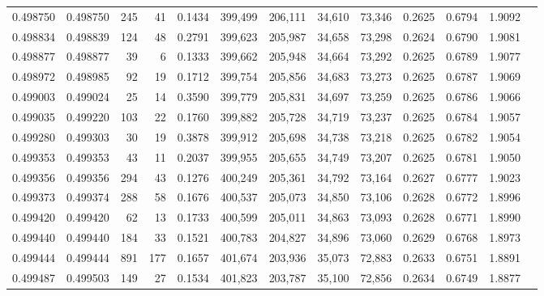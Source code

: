 \begin{tabular}{rrrrrrrrrrrrr}
0.498750 & 0.498750 &   245 &    41 &                                     0.1434 & 399,499 & 206,111 &  34,610 &  73,346 & 0.2625 & 0.6794 & 1.9092 \\
0.498834 & 0.498839 &   124 &    48 &                                     0.2791 & 399,623 & 205,987 &  34,658 &  73,298 & 0.2624 & 0.6790 & 1.9081 \\
0.498877 & 0.498877 &    39 &     6 &                                     0.1333 & 399,662 & 205,948 &  34,664 &  73,292 & 0.2625 & 0.6789 & 1.9077 \\
0.498972 & 0.498985 &    92 &    19 &                                     0.1712 & 399,754 & 205,856 &  34,683 &  73,273 & 0.2625 & 0.6787 & 1.9069 \\
0.499003 & 0.499024 &    25 &    14 &                                     0.3590 & 399,779 & 205,831 &  34,697 &  73,259 & 0.2625 & 0.6786 & 1.9066 \\
0.499035 & 0.499220 &   103 &    22 &                                     0.1760 & 399,882 & 205,728 &  34,719 &  73,237 & 0.2625 & 0.6784 & 1.9057 \\
0.499280 & 0.499303 &    30 &    19 &                                     0.3878 & 399,912 & 205,698 &  34,738 &  73,218 & 0.2625 & 0.6782 & 1.9054 \\
0.499353 & 0.499353 &    43 &    11 &                                     0.2037 & 399,955 & 205,655 &  34,749 &  73,207 & 0.2625 & 0.6781 & 1.9050 \\
0.499356 & 0.499356 &   294 &    43 &                                     0.1276 & 400,249 & 205,361 &  34,792 &  73,164 & 0.2627 & 0.6777 & 1.9023 \\
0.499373 & 0.499374 &   288 &    58 &                                     0.1676 & 400,537 & 205,073 &  34,850 &  73,106 & 0.2628 & 0.6772 & 1.8996 \\
0.499420 & 0.499420 &    62 &    13 &                                     0.1733 & 400,599 & 205,011 &  34,863 &  73,093 & 0.2628 & 0.6771 & 1.8990 \\
0.499440 & 0.499440 &   184 &    33 &                                     0.1521 & 400,783 & 204,827 &  34,896 &  73,060 & 0.2629 & 0.6768 & 1.8973 \\
0.499444 & 0.499444 &   891 &   177 &                                     0.1657 & 401,674 & 203,936 &  35,073 &  72,883 & 0.2633 & 0.6751 & 1.8891 \\
0.499487 & 0.499503 &   149 &    27 &                                     0.1534 & 401,823 & 203,787 &  35,100 &  72,856 & 0.2634 & 0.6749 & 1.8877 \\

\end{tabular}
